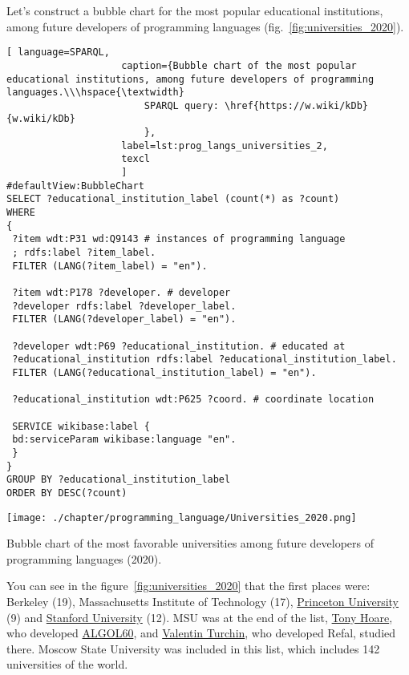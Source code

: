 Let's construct a bubble chart for the most popular educational institutions, among future developers of programming languages (fig.~\ref{fig:universities_2020}). 

\begin{lstlisting}[ language=SPARQL, 
                    caption={Bubble chart of the most popular educational institutions, among future developers of programming languages.\\\hspace{\textwidth}
                        SPARQL query: \href{https://w.wiki/kDb}{w.wiki/kDb}
                        },
                    label=lst:prog_langs_universities_2,
                    texcl 
                    ]
#defaultView:BubbleChart
SELECT ?educational_institution_label (count(*) as ?count)
WHERE
{
 ?item wdt:P31 wd:Q9143 # instances of programming language
 ; rdfs:label ?item_label. 
 FILTER (LANG(?item_label) = "en"). 
 
 ?item wdt:P178 ?developer. # developer
 ?developer rdfs:label ?developer_label. 
 FILTER (LANG(?developer_label) = "en"). 
 	
 ?developer wdt:P69 ?educational_institution. # educated at
 ?educational_institution rdfs:label ?educational_institution_label. 
 FILTER (LANG(?educational_institution_label) = "en").
 
 ?educational_institution wdt:P625 ?coord. # coordinate location
 
 SERVICE wikibase:label {
 bd:serviceParam wikibase:language "en".
 } 	
}
GROUP BY ?educational_institution_label
ORDER BY DESC(?count)
\end{lstlisting}%

\begin{marginfigure}[-7cm]
	\texttt{[image: ./chapter/programming\_language/Universities\_2020.png]}
	\caption{Bubble chart of the most favorable universities among future developers of programming languages (2020).}
	\label{fig:universities_2020}
\end{marginfigure}

You can see in the figure~\ref{fig:universities_2020} that the first places were: Berkeley (19), Massachusetts Institute of Technology (17), \href{https://en.wikipedia.org/wiki/Princeton_University}{Princeton University} (9) and \href{https://en.wikipedia.org/wiki/Stanford_University}{Stanford University} (12). MSU was at the end of the list, \href{https://en.wikipedia.org/wiki/Tony_Hoare}{Tony Hoare}, who developed \href{https://en.wikipedia.org/wiki/ALGOL}{ALGOL60}, and \href{https://en.wikipedia.org/wiki/Valentin_Turchin}{Valentin Turchin}, who developed Refal, studied there. Moscow State University was included in this list, which includes 142 universities of the world.

